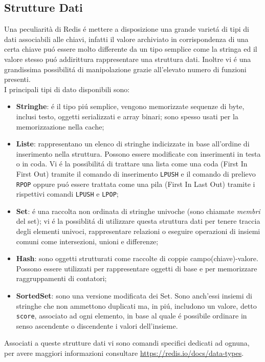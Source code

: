\subsection{Strutture Dati}
Una peculiarità di Redis é mettere a disposizione una grande varietá di tipi di dati associabili alle chiavi, infatti il valore archiviato
in corrispondenza di una certa chiave puó essere molto differente da un tipo semplice come la stringa ed il valore stesso puó addirittura
rappresentare una struttura dati. Inoltre vi é una grandissima possibilitá di manipolazione grazie all'elevato numero di funzioni presenti.\\
I principali tipi di dato disponibili sono:
\begin{itemize}
    \item \textbf{Stringhe}: é il tipo piú semplice, vengono memorizzate sequenze di byte, inclusi testo, oggetti serializzati e array binari;
    sono spesso usati per la memorizzazione nella cache;
    \item \textbf{Liste}: rappresentano un elenco di stringhe indicizzate in base all'ordine di inserimento nella struttura. Possono essere
    modificate con inserimenti in testa o in coda. Vi é la possibilitá di trattare una lista come una coda (First In First Out) tramite il comando di inserimento
    \texttt{LPUSH} e il comando di prelievo \texttt{RPOP} oppure puó essere trattata come una pila (First In Last Out) tramite i rispettivi comandi 
    \texttt{LPUSH} e \texttt{LPOP};
    \item \textbf{Set}: é una raccolta non ordinata di stringhe univoche (sono chiamate \emph{membri} del set); vi é la possiblitá
    di utilizzare questa struttura dati per tenere traccia degli elementi univoci, rappresentare relazioni o eseguire operazioni di insiemi
    comuni come intersezioni, unioni e differenze;
    \item \textbf{Hash}: sono oggetti strutturati come raccolte di coppie campo(chiave)-valore. Possono essere utilizzati per rappresentare oggetti
    di base e per memorizzare raggruppamenti di contatori;
    \item \textbf{SortedSet}: sono una versione modificata dei Set. Sono anch'essi insiemi di stringhe che non ammettono duplicati ma, in piú,
    includono un valore, detto \texttt{score}, associato ad ogni elemento, in base al quale é possibile ordinare in senso ascendente o discendente i valori
    dell'insieme.
\end{itemize}
    Associati a queste strutture dati vi sono comandi specifici dedicati ad ognuna, per avere maggiori informazioni consultare
    \url{https://redis.io/docs/data-types}.

